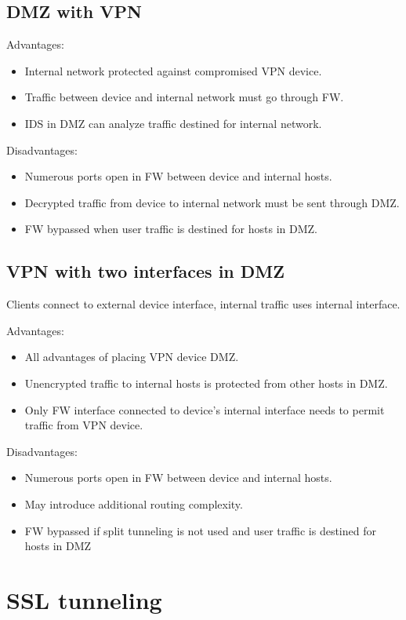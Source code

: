 \subsection{DMZ with VPN}
Advantages:
\begin{itemize}
    \item Internal network protected against compromised VPN device.
    \item Traffic between device and internal network must go through FW.
    \item IDS in DMZ can analyze traffic destined for internal network.
\end{itemize}
Disadvantages:
\begin{itemize}
    \item Numerous ports open in FW between device and internal hosts.
    \item Decrypted traffic from device to internal network must be sent through DMZ.
    \item  FW bypassed when user traffic is destined for hosts in DMZ.
\end{itemize}

\subsection{VPN with two interfaces in DMZ}
Clients connect to external device interface, internal traffic uses internal
interface.

Advantages:
\begin{itemize}
    \item All advantages of placing VPN device DMZ.
    \item Unencrypted traffic to internal hosts is protected from other hosts in DMZ.
    \item Only FW interface connected to device’s internal interface needs to permit traffic
from VPN device.
\end{itemize}
Disadvantages:
\begin{itemize}
    \item Numerous ports open in FW between device and internal hosts.
    \item May introduce additional routing complexity.
    \item FW bypassed if split tunneling is not used and user traffic is destined for hosts in
DMZ
\end{itemize}

\section{SSL tunneling}
